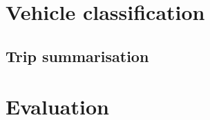 \section{Vehicle classification}\label{s.classification}

\subsection{Trip summarisation}

\section{Evaluation}\label{s.results}
